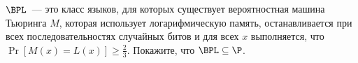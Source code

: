 $\BPL$~--- это класс языков, для которых существует вероятностная машина Тьюринга $M$, которая использует
логарифмическую память, останавливается при всех последовательностях случайных битов и для всех $x$
выполняется, что $\Pr[M(x) = L(x)] \ge \frac{2}{3}$. Покажите, что $\BPL \subseteq \P$.
